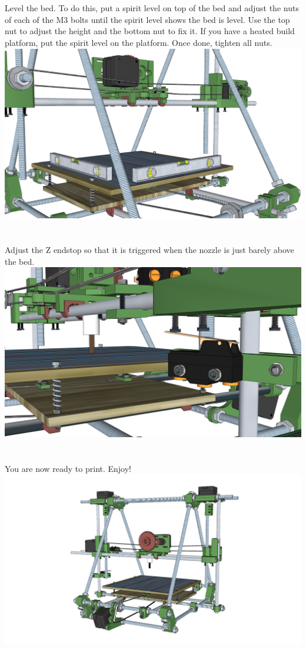 \documentclass[twoside,a4paper,titlepage]{memoir}
\begin{document}
	\section{}
	Level the bed. To do this, put a spirit level on top of the bed and adjust the nuts of each of the M3 bolts
	until the spirit level shows the bed is level. Use the top nut to adjust the height and the bottom nut to fix
	it. If you have a heated build platform, put the spirit level on the platform. Once done, tighten all nuts.\\
	\includegraphics[width=1\linewidth]{graphics/ch11_8.png}
	
	\section{}
	Adjust the Z endstop so that it is triggered when the nozzle is just
	barely above the bed.\\
	\includegraphics[width=1\linewidth]{graphics/ch11_9.png}
	
	\section{}
	You are now ready to print. Enjoy!\\
	\includegraphics[width=1\linewidth]{graphics/ch11_10.png}
	
	\printindex
\end{document}
